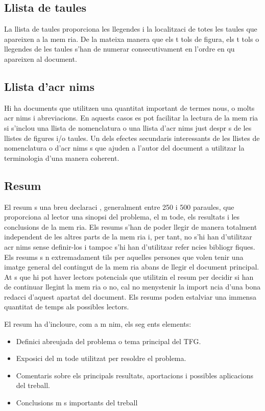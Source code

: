 \subsection{Llista de taules}

La llista de taules proporciona les llegendes i la localitzaci  de totes les taules que apareixen a la mem ria. De la mateixa manera que els t tols de figura, els t tols o llegendes de les taules s'han de numerar consecutivament en l'ordre en qu  apareixen al document.

\subsection{Llista d'acr nims}

Hi ha documents que utilitzen una quantitat important de termes nous, o molts acr nims i abreviacions. En aquests casos es pot facilitar la lectura de la mem ria si s'inclou una llista de nomenclatura o una llista d'acr nims just despr s de les llistes de figures i/o taules. Un dels efectes secundaris interessants de les llistes de nomenclatura o d'acr nims  s que ajuden a l'autor del document a utilitzar la terminologia d'una manera coherent.

\subsection{Resum}

El resum  s una breu declaraci , generalment entre 250 i 500 paraules, que proporciona al lector una sinopsi del problema, el m tode, els resultats i les conclusions de la mem ria. Els resums s'han de poder llegir de manera totalment independent de les altres parts de la mem ria i, per tant, no s'hi han d'utilitzar acr nims sense definir-los i tampoc s'hi han d'utilitzar refer ncies bibliogr fiques. Els resums s n extremadament  tils per aquelles persones que volen tenir una imatge general del contingut de la mem ria abans de llegir el document principal. At s que hi pot haver lectors potencials que utilitzin el resum per decidir si han de continuar llegint la mem ria o no, cal no menystenir la import ncia d'una bona redacci  d'aquest apartat del document. Els resums poden estalviar una immensa quantitat de temps als possibles lectors.

El resum ha d'incloure, com a m nim, els seg ents elements:
\begin{itemize}
   \item Definici  abreujada del problema o tema principal del TFG.

   \item Exposici  del m tode utilitzat per resoldre el problema.

   \item Comentaris sobre els principals resultats, aportacions i possibles aplicacions del treball.

   \item Conclusions m s importants del treball
\end{itemize}

